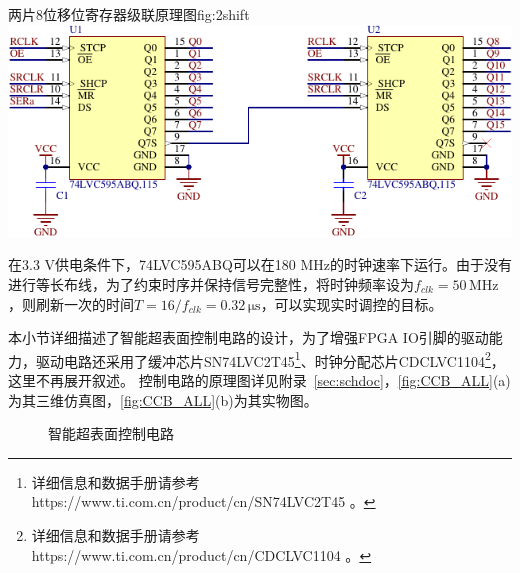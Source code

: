 \documentclass[supercite]{HustGraduPaper}
\begin{document}
\begin{generalfig}[htb]{两片8位移位寄存器级联原理图}{fig:2shift}
	\includegraphics[width=0.8\linewidth]{Figures/2shift.pdf}
\end{generalfig}

在3.3 V供电条件下，74LVC595ABQ可以在180 MHz的时钟速率下运行。由于没有进行等长布线，为了约束时序并保持信号完整性，将时钟频率设为$f_{clk}=50 \,\mathrm{MHz}$，则刷新一次的时间$T=16/f_{clk}=0.32 \,\mathrm{\mu s}$，可以实现实时调控的目标。


本小节详细描述了智能超表面控制电路的设计，为了增强FPGA IO引脚的驱动能力，驱动电路还采用了缓冲芯片SN74LVC2T45\footnote{详细信息和数据手册请参考 https://www.ti.com.cn/product/cn/SN74LVC2T45 。}、时钟分配芯片CDCLVC1104\footnote{详细信息和数据手册请参考 https://www.ti.com.cn/product/cn/CDCLVC1104 。}，这里不再展开叙述。
控制电路的原理图详见附录~\ref{sec:schdoc}，\autoref{fig:CCB_ALL}(a)为其三维仿真图，\autoref{fig:CCB_ALL}(b)为其实物图。

\begin{figure}[htb]
	\centering
	\hfil
	\caption{智能超表面控制电路}
	\label{fig:CCB_ALL}
\end{figure}
\end{document}
